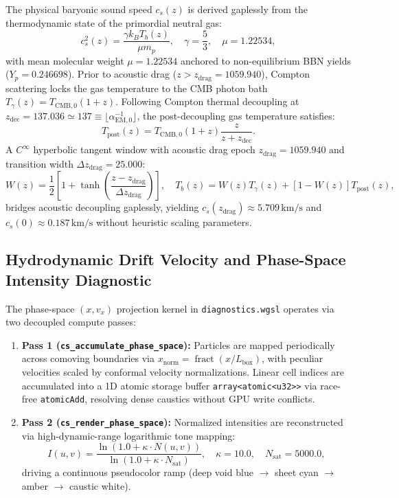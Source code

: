 \documentclass[11pt]{article}
\theoremstyle{plain}
\begin{document}
The physical baryonic sound speed $c_s(z)$ is derived gaplessly from the thermodynamic state of the primordial neutral gas:
\begin{equation}
c_s^2(z) = \frac{\gamma k_B T_b(z)}{\mu m_p}, \quad \gamma = \frac{5}{3}, \quad \mu = 1.22534,
\end{equation}
with mean molecular weight $\mu = 1.22534$ anchored to non-equilibrium BBN yields ($Y_p = 0.246698$). Prior to acoustic drag ($z > z_{\mathrm{drag}} = 1059.940$), Compton scattering locks the gas temperature to the CMB photon bath $T_\gamma(z) = T_{\mathrm{CMB}, 0}(1 + z)$. Following Compton thermal decoupling at $z_{\mathrm{dec}} = 137.036 \simeq 137 \equiv \lfloor \alpha_{\mathrm{EM},0}^{-1} \rfloor$, the post-decoupling gas temperature satisfies:
\begin{equation}
T_{\mathrm{post}}(z) = T_{\mathrm{CMB}, 0} (1 + z) \frac{z}{z + z_{\mathrm{dec}}}.
\end{equation}
A $C^\infty$ hyperbolic tangent window with acoustic drag epoch $z_{\mathrm{drag}} = 1059.940$ and transition width $\Delta z_{\mathrm{drag}} = 25.000$:
\begin{equation}
W(z) = \frac{1}{2} \left[ 1 + \tanh\left( \frac{z - z_{\mathrm{drag}}}{\Delta z_{\mathrm{drag}}} \right) \right], \quad T_b(z) = W(z) T_\gamma(z) + [1 - W(z)] T_{\mathrm{post}}(z),
\end{equation}
bridges acoustic decoupling gaplessly, yielding $c_s(z_{\mathrm{drag}}) \approx 5.709\,\mathrm{km/s}$ and $c_s(0) \approx 0.187\,\mathrm{km/s}$ without heuristic scaling parameters.


\subsection{Hydrodynamic Drift Velocity and Phase-Space Intensity Diagnostic}
\label{app:drift-velocity-phase-space}
The phase-space $(x, v_x)$ projection kernel in \texttt{diagnostics.wgsl} operates via two decoupled compute passes:
\begin{enumerate}
    \item \textbf{Pass 1 (\texttt{cs\_accumulate\_phase\_space}):} Particles are mapped periodically across comoving boundaries via $x_{\mathrm{norm}} = \operatorname{fract}(x/L_{\mathrm{box}})$, with peculiar velocities scaled by conformal velocity normalizations. Linear cell indices are accumulated into a 1D atomic storage buffer \texttt{array<atomic<u32>>} via race-free \texttt{atomicAdd}, resolving dense caustics without GPU write conflicts.
    \item \textbf{Pass 2 (\texttt{cs\_render\_phase\_space}):} Normalized intensities are reconstructed via high-dynamic-range logarithmic tone mapping:
    \begin{equation}
    I(u, v) = \frac{\ln(1.0 + \kappa \cdot N(u, v))}{\ln(1.0 + \kappa \cdot N_{\mathrm{sat}})}, \quad \kappa = 10.0, \quad N_{\mathrm{sat}} = 5000.0,
    \end{equation}
    driving a continuous pseudocolor ramp (deep void blue $\to$ sheet cyan $\to$ amber $\to$ caustic white).
\end{enumerate}
\end{document}
